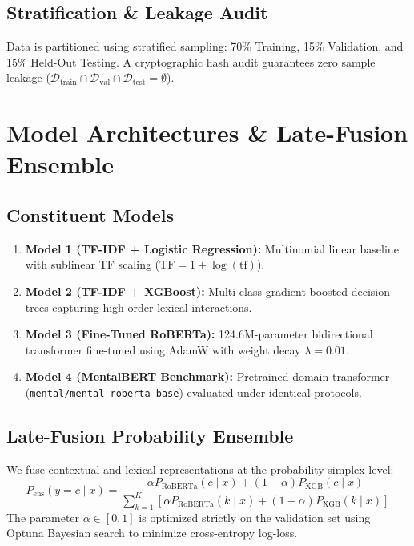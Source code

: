 \documentclass[conference]{IEEEtran}
\begin{document}
\subsection{Stratification \& Leakage Audit}
Data is partitioned using stratified sampling: 70\% Training, 15\% Validation, and 15\% Held-Out Testing. A cryptographic hash audit guarantees zero sample leakage ($\mathcal{D}_{\text{train}} \cap \mathcal{D}_{\text{val}} \cap \mathcal{D}_{\text{test}} = \emptyset$).

\section{Model Architectures \& Late-Fusion Ensemble}
\subsection{Constituent Models}
\begin{enumerate}
    \item \textbf{Model 1 (TF-IDF + Logistic Regression):} Multinomial linear baseline with sublinear TF scaling ($\text{TF} = 1 + \log(\text{tf})$).
    \item \textbf{Model 2 (TF-IDF + XGBoost):} Multi-class gradient boosted decision trees capturing high-order lexical interactions.
    \item \textbf{Model 3 (Fine-Tuned RoBERTa):} 124.6M-parameter bidirectional transformer fine-tuned using AdamW with weight decay $\lambda=0.01$.
    \item \textbf{Model 4 (MentalBERT Benchmark):} Pretrained domain transformer (\texttt{mental/mental-roberta-base}) evaluated under identical protocols.
\end{enumerate}

\subsection{Late-Fusion Probability Ensemble}
We fuse contextual and lexical representations at the probability simplex level:
\begin{equation}
P_{\text{ens}}(y = c \mid x) = \frac{\alpha P_{\text{RoBERTa}}(c \mid x) + (1-\alpha) P_{\text{XGB}}(c \mid x)}{\sum_{k=1}^K \left[ \alpha P_{\text{RoBERTa}}(k \mid x) + (1-\alpha) P_{\text{XGB}}(k \mid x) \right]}
\end{equation}
The parameter $\alpha \in [0, 1]$ is optimized strictly on the validation set using Optuna Bayesian search to minimize cross-entropy log-loss.
\end{document}

